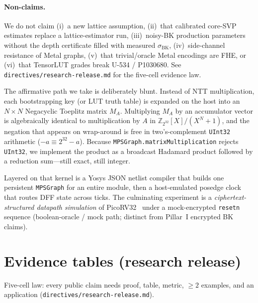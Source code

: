 \documentclass[11pt,a4paper]{article}
\begin{document}
\paragraph{Non-claims.}
We do not claim (i)~a new lattice assumption, (ii)~that calibrated core-SVP
estimates replace a lattice-estimator run, (iii)~noisy-BK production parameters
without the depth certificate filled with measured $\sigma_{\mathrm{BK}}$,
(iv)~side-channel resistance of Metal graphs, (v)~that trivial/oracle Metal
encodings are FHE, or (vi)~that TensorLUT grades break U-534 / P1030680.
See \texttt{directives/research-release.md} for the five-cell evidence law.

The affirmative path we take is deliberately blunt.
Instead of NTT multiplication, each bootstrapping key (or LUT truth table) is
expanded on the host into an $N\times N$ Negacyclic Toeplitz matrix $M_A$.
Multiplying $M_A$ by an accumulator vector is algebraically identical to
multiplication by $A$ in $\mathbb{Z}_{2^{32}}[X]/(X^N+1)$, and the negation that
appears on wrap-around is free in two's-complement \texttt{UInt32} arithmetic
($-a \equiv 2^{32}-a$).
Because \texttt{MPSGraph.matrixMultiplication} rejects \texttt{UInt32}, we implement
the product as a broadcast Hadamard product followed by a reduction sum---still
exact, still integer.

Layered on that kernel is a Yosys JSON netlist compiler that builds one persistent
\texttt{MPSGraph} for an entire module, then a host-emulated posedge clock that
routes DFF state across ticks.
The culminating experiment is a \emph{ciphertext-structured datapath simulation}
of PicoRV32~\cite{picorv32} under a mock-encrypted \texttt{resetn} sequence
(boolean-oracle / mock path; distinct from Pillar~I encrypted BK claims).

\section{Evidence tables (research release)}
\label{sec:evidence}

Five-cell law: every public claim needs proof, table, metric, $\ge 2$ examples,
and an application (\texttt{directives/research-release.md}).
\end{document}
